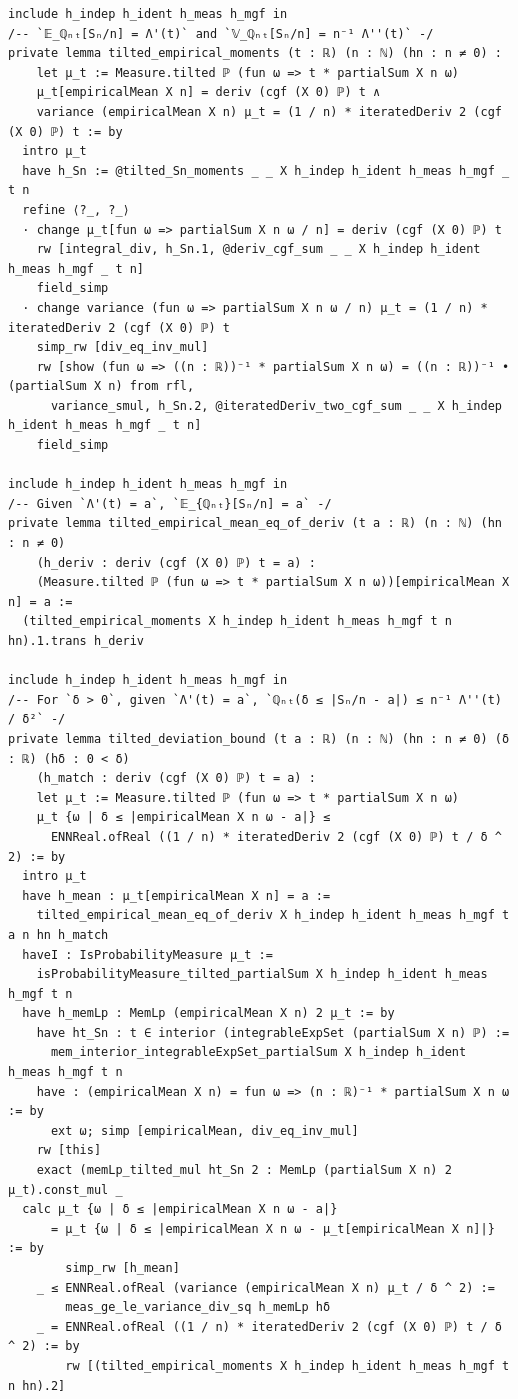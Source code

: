 \newpage
\begin{lstlisting}
include h_indep h_ident h_meas h_mgf in
/-- `𝔼_ℚₙₜ[Sₙ/n] = Λ'(t)` and `𝕍_ℚₙₜ[Sₙ/n] = n⁻¹ Λ''(t)` -/
private lemma tilted_empirical_moments (t : ℝ) (n : ℕ) (hn : n ≠ 0) :
    let μ_t := Measure.tilted ℙ (fun ω => t * partialSum X n ω)
    μ_t[empiricalMean X n] = deriv (cgf (X 0) ℙ) t ∧
    variance (empiricalMean X n) μ_t = (1 / n) * iteratedDeriv 2 (cgf (X 0) ℙ) t := by
  intro μ_t
  have h_Sn := @tilted_Sn_moments _ _ X h_indep h_ident h_meas h_mgf _ t n
  refine ⟨?_, ?_⟩
  · change μ_t[fun ω => partialSum X n ω / n] = deriv (cgf (X 0) ℙ) t
    rw [integral_div, h_Sn.1, @deriv_cgf_sum _ _ X h_indep h_ident h_meas h_mgf _ t n]
    field_simp
  · change variance (fun ω => partialSum X n ω / n) μ_t = (1 / n) * iteratedDeriv 2 (cgf (X 0) ℙ) t
    simp_rw [div_eq_inv_mul]
    rw [show (fun ω => ((n : ℝ))⁻¹ * partialSum X n ω) = ((n : ℝ))⁻¹ • (partialSum X n) from rfl,
      variance_smul, h_Sn.2, @iteratedDeriv_two_cgf_sum _ _ X h_indep h_ident h_meas h_mgf _ t n]
    field_simp

include h_indep h_ident h_meas h_mgf in
/-- Given `Λ'(t) = a`, `𝔼_{ℚₙₜ}[Sₙ/n] = a` -/
private lemma tilted_empirical_mean_eq_of_deriv (t a : ℝ) (n : ℕ) (hn : n ≠ 0)
    (h_deriv : deriv (cgf (X 0) ℙ) t = a) :
    (Measure.tilted ℙ (fun ω => t * partialSum X n ω))[empiricalMean X n] = a :=
  (tilted_empirical_moments X h_indep h_ident h_meas h_mgf t n hn).1.trans h_deriv

include h_indep h_ident h_meas h_mgf in
/-- For `δ > 0`, given `Λ'(t) = a`, `ℚₙₜ(δ ≤ |Sₙ/n - a|) ≤ n⁻¹ Λ''(t) / δ²` -/
private lemma tilted_deviation_bound (t a : ℝ) (n : ℕ) (hn : n ≠ 0) (δ : ℝ) (hδ : 0 < δ)
    (h_match : deriv (cgf (X 0) ℙ) t = a) :
    let μ_t := Measure.tilted ℙ (fun ω => t * partialSum X n ω)
    μ_t {ω | δ ≤ |empiricalMean X n ω - a|} ≤
      ENNReal.ofReal ((1 / n) * iteratedDeriv 2 (cgf (X 0) ℙ) t / δ ^ 2) := by
  intro μ_t
  have h_mean : μ_t[empiricalMean X n] = a :=
    tilted_empirical_mean_eq_of_deriv X h_indep h_ident h_meas h_mgf t a n hn h_match
  haveI : IsProbabilityMeasure μ_t :=
    isProbabilityMeasure_tilted_partialSum X h_indep h_ident h_meas h_mgf t n
  have h_memLp : MemLp (empiricalMean X n) 2 μ_t := by
    have ht_Sn : t ∈ interior (integrableExpSet (partialSum X n) ℙ) :=
      mem_interior_integrableExpSet_partialSum X h_indep h_ident h_meas h_mgf t n
    have : (empiricalMean X n) = fun ω => (n : ℝ)⁻¹ * partialSum X n ω := by
      ext ω; simp [empiricalMean, div_eq_inv_mul]
    rw [this]
    exact (memLp_tilted_mul ht_Sn 2 : MemLp (partialSum X n) 2 μ_t).const_mul _
  calc μ_t {ω | δ ≤ |empiricalMean X n ω - a|}
      = μ_t {ω | δ ≤ |empiricalMean X n ω - μ_t[empiricalMean X n]|} := by
        simp_rw [h_mean]
    _ ≤ ENNReal.ofReal (variance (empiricalMean X n) μ_t / δ ^ 2) :=
        meas_ge_le_variance_div_sq h_memLp hδ
    _ = ENNReal.ofReal ((1 / n) * iteratedDeriv 2 (cgf (X 0) ℙ) t / δ ^ 2) := by
        rw [(tilted_empirical_moments X h_indep h_ident h_meas h_mgf t n hn).2]
\end{lstlisting}

